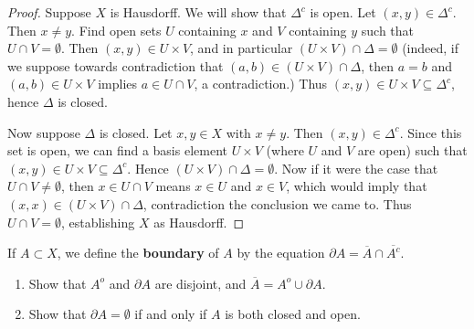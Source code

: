 \documentclass[12pt,twoside,openany]{memoir}
\begin{document}
    \begin{proof}
        Suppose $X$ is Hausdorff. We will show that $\Delta^c$ is open. Let $(x,y) \in \Delta^c$. Then $x \neq y$. Find open sets $U$ containing $x$ and $V$ containing $y$ such that $U \cap V = \emptyset$. Then $(x,y) \in U \times V$, and in particular $(U \times V) \cap \Delta = \emptyset$ (indeed, if we suppose towards contradiction that $(a,b) \in (U \times V) \cap \Delta$, then $a=b$ and $(a,b) \in U \times V$ implies $a \in U \cap V$, a contradiction.) Thus $(x,y) \in U \times V \subseteq \Delta^c$, hence $\Delta$ is closed.

        Now suppose $\Delta$ is closed. Let $x,y \in X$ with $x \neq y$. Then $(x,y) \in \Delta^c$. Since this set is open, we can find a basis element $U \times V$ (where $U$ and $V$ are open) such that $(x,y) \in U \times V \subseteq \Delta^c$. Hence $(U \times V) \cap \Delta = \emptyset$. Now if it were the case that $U \cap V \neq \emptyset$, then $x \in U \cap V$ means $x \in U$ and $x \in V$, which would imply that $(x,x) \in (U \times V) \cap \Delta$, contradiction the conclusion we came to. Thus $U \cap V = \emptyset$, establishing $X$ as Hausdorff.
    \end{proof}
\begin{exercise}[manual-num={19}]
    If $A \subset X$, we define the \textbf{boundary} of $A$ by the equation $\partial A = \overline{A} \cap \overline{A^c}$.
    \begin{enumerate}[label = (\alph*),itemsep=1pt,topsep=3pt]
        \item Show that $A^o$ and $\partial A$ are disjoint, and $\overline{A} = A^o \cup \partial A$.
        \item Show that $\partial A = \emptyset$ if and only if $A$ is both closed and open.
    \end{enumerate}
\end{exercise}
\end{document}
